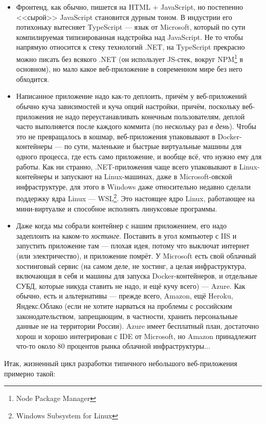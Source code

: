 \documentclass[a5paper]{article}
\begin{document}
\begin{itemize}
    \item Фронтенд, как обычно, пишется на HTML + JavaScript, но постепенно <<сырой>> JavaScript становится дурным тоном. В индустрии его потихоньку вытесняет TypeScript --- язык от Microsoft, который по сути компилируемая типизированная надстройка над JavaScript. Не то чтобы напрямую относится к стеку технологий .NET, на TypeScript прекрасно можно писать без всякого .NET (он использует JS-стек, вокруг NPM\footnote{Node Package Manager} в основном), но мало какое веб-приложение в современном мире без него обходится.
    \item Написанное приложение надо как-то деплоить, причём у веб-приложений обычно куча зависимостей и куча опций настройки, причём, поскольку веб-приложения не надо переустанавливать конечным пользователям, деплой часто выполняется после каждого коммита (по нескольку раз \emph{в день}). Чтобы это не превращалось в кошмар, веб-приложения упаковывают в Docker-контейнеры --- по сути, маленькие и быстрые виртуальные машины для одного процесса, где есть само приложение, и вообще всё, что нужно ему для работы. Как ни странно, .NET-приложения чаще всего упаковывают в Linux-контейнеры и запускают на Linux-машинах, даже в Microsoft-овской инфраструктуре, для этого в Windows даже относительно недавно сделали поддержку ядра Linux --- WSL\footnote{Windows Subsystem for Linux}. Это настоящее ядро Linux, работающее на мини-виртуалке и способное исполнять линуксовые программы.
    \item Даже когда мы собрали контейнер с нашим приложением, его надо задеплоить на каком-то \emph{хостинге}. Поставить в угол компьютер с IIS и запустить приложение там --- плохая идея, потому что выключат интернет (или электричество), и приложение помрёт. У Microsoft есть свой облачный хостинговый сервис (на самом деле, не хостинг, а целая инфраструктура, включающая в себя и машины для запуска Docker-контейнеров, и отдельные СУБД, которые никуда ставить не надо, и ещё кучу всего) --- Azure. Как обычно, есть и альтернативы --- прежде всего, Amazon, ещё Heroku, Яндекс.Облако (если не хотите нарваться на проблемы с российским законодательством, запрещающим, в частности, хранить персональные данные не на территории России). Azure имеет бесплатный план, достаточно хорош и хорошо интегрирован с IDE от Microsoft, но Amazon принадлежит что-то около 80 процентов рынка облачной инфраструктуры...
\end{itemize}

Итак, жизненный цикл разработки типичного небольшого веб-приложения примерно такой:
\end{document}

